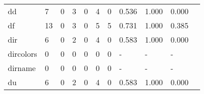 \begin{longtable}{lp{1.20cm}p{1.20cm}p{1.20cm}p{1.20cm}p{1.20cm}p{1.20cm}p{1.20cm}p{1.20cm}p{1.20cm}p{1.20cm}}
dd        &                                     7 &                                                  0 &                                                  3 &                                                  0 &                                                  4 &                                                  0 &                                         0.536 &                                              1.000 &                                              0.000 \\
df        &                                    13 &                                                  0 &                                                  3 &                                                  0 &                                                  5 &                                                  5 &                                         0.731 &                                              1.000 &                                              0.385 \\
dir       &                                     6 &                                                  0 &                                                  2 &                                                  0 &                                                  4 &                                                  0 &                                         0.583 &                                              1.000 &                                              0.000 \\
dircolors &                                     0 &                                                  0 &                                                  0 &                                                  0 &                                                  0 &                                                  0 &                                             - &                                                  - &                                                  - \\
dirname   &                                     0 &                                                  0 &                                                  0 &                                                  0 &                                                  0 &                                                  0 &                                             - &                                                  - &                                                  - \\
du        &                                     6 &                                                  0 &                                                  2 &                                                  0 &                                                  4 &                                                  0 &                                         0.583 &                                              1.000 &                                              0.000 \\

\end{longtable}
